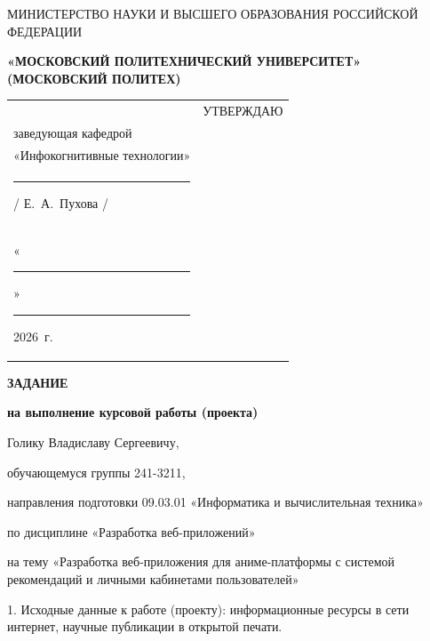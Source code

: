 \documentclass[14pt, a4paper]{extarticle}
\begin{document}
\pagestyle{empty}


\begin{center}
    {\small МИНИСТЕРСТВО НАУКИ И ВЫСШЕГО ОБРАЗОВАНИЯ РОССИЙСКОЙ ФЕДЕРАЦИИ}


    {\small \textbf{«МОСКОВСКИЙ ПОЛИТЕХНИЧЕСКИЙ УНИВЕРСИТЕТ»}} \\
    {\small \textbf{(МОСКОВСКИЙ ПОЛИТЕХ)}}
\end{center}

\begin{tabularx}{\textwidth}{@{} p{} p{} @{}}
     &
    \raggedright
    УТВЕРЖДАЮ                          \\
    заведующая кафедрой                \\
    «Инфокогнитивные технологии»       \\[0.3cm]

    \rule{3cm}{0.4pt} / Е.~А.~Пухова / \\[0.1cm]

    «\rule{0.8cm}{0.4pt}» \rule{3cm}{0.4pt} 2026~г.
\end{tabularx}


\begin{center}

    { \large \textbf{ЗАДАНИЕ}}

    \textbf{на выполнение курсовой работы (проекта)}

    Голику Владиславу Сергеевичу,

\end{center}

обучающемуся группы 241-3211,

направления подготовки 09.03.01 «Информатика и вычислительная техника»

по дисциплине «Разработка веб-приложений»

на тему «Разработка веб-приложения для аниме-платформы с системой рекомендаций и личными кабинетами пользователей»

1. Исходные данные к работе (проекту): информационные ресурсы в сети
интернет, научные публикации в открытой печати.
\end{document}
